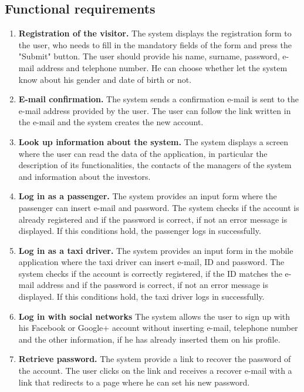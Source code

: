 \documentclass[18pt,oneside,a4paper, titlepage]{article}
\begin{document}
	\subsection{Functional requirements}
		\begin{enumerate}
			\item \textbf{Registration of the visitor.}
				The system displays the registration form to the user, who needs to fill in the mandatory fields of the form and press the "Submit" button. The user should provide his name, surname, password, e-mail address and telephone number. He can choose whether let the system know about his gender and date of birth or not.
			
			\item \textbf{E-mail confirmation.}
				The system sends a confirmation e-mail is sent to the e-mail address provided by the user. The user can follow the link written in the e-mail and the system creates the new account.
				
			\item \textbf{Look up information about the system.}
				The system displays a screen where the user can read the data of the application, in particular the description of its functionalities, the contacts of the managers of the system and information about the investors.
				
			\item \textbf{Log in as a passenger.}
				The system provides an input form where the passenger can insert e-mail and password. The system checks if the account is already registered and if the password is correct, if not an error message is displayed. If this conditions hold, the passenger logs in successfully.
				
			\item \textbf{Log in as a taxi driver.}
				The system provides an input form in the mobile application where the taxi driver can insert e-mail, ID and password. The system checks if the account is correctly registered, if the ID matches the e-mail address and if the password is correct, if not an error message is displayed. If this conditions hold, the taxi driver logs in successfully.
				
			\item \textbf{Log in with social networks}
				The system allows the user to sign up with his Facebook or Google+ account without inserting e-mail, telephone number and the other information, if he has already inserted them on his profile.
				
			\item \textbf{Retrieve password.}
				The system provide a link to recover the password of the account. The user clicks on the link and receives a recover e-mail with a link that redirects to a page where he can set his new password.
				

\end{enumerate}
\end{document}
